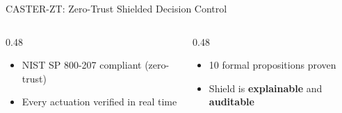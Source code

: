 \documentclass[10pt,aspectratio=169]{beamer}
\begin{document}
\begin{frame}[shrink=5]{CASTER-ZT: Zero-Trust Shielded Decision Control}
\vspace{3pt}
\small
\begin{columns}[T]
\begin{column}{0.48\textwidth}
  \begin{itemize}
    \item NIST SP 800-207 compliant (zero-trust)
    \item Every actuation verified in real time
  \end{itemize}
\end{column}
\begin{column}{0.48\textwidth}
  \begin{itemize}
    \item 10 formal propositions proven
    \item Shield is \textbf{explainable} and \textbf{auditable}
  \end{itemize}
\end{column}
\end{columns}
\end{frame}
\end{document}
